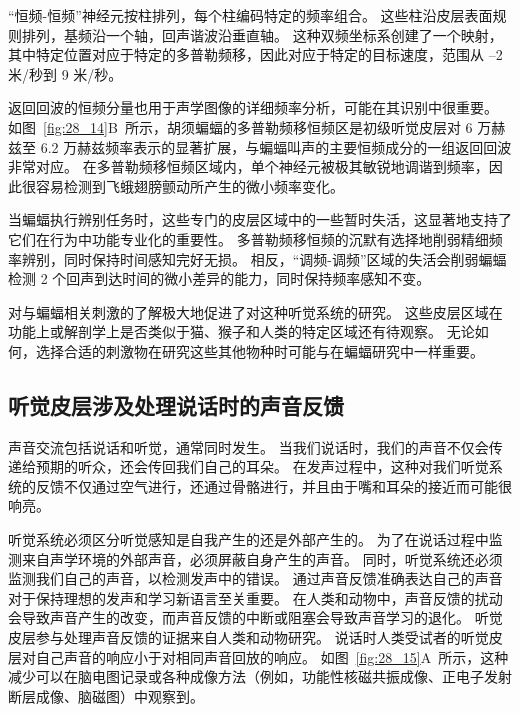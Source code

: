 “恒频-恒频”神经元按柱排列，每个柱编码特定的频率组合。
这些柱沿皮层表面规则排列，基频沿一个轴，回声谐波沿垂直轴。
这种双频坐标系创建了一个映射，其中特定位置对应于特定的多普勒频移，因此对应于特定的目标速度，范围从 –2 米/秒到 9 米/秒。


返回回波的恒频分量也用于声学图像的详细频率分析，可能在其识别中很重要。
如图~\ref{fig:28_14}B~所示，胡须蝙蝠的多普勒频移恒频区是初级听觉皮层对 6 万赫兹至 6.2 万赫兹频率表示的显著扩展，与蝙蝠叫声的主要恒频成分的一组返回回波非常对应。
在多普勒频移恒频区域内，单个神经元被极其敏锐地调谐到频率，因此很容易检测到飞蛾翅膀颤动所产生的微小频率变化。


当蝙蝠执行辨别任务时，这些专门的皮层区域中的一些暂时失活，这显著地支持了它们在行为中功能专业化的重要性。
多普勒频移恒频的沉默有选择地削弱精细频率辨别，同时保持时间感知完好无损。
相反，“调频-调频”区域的失活会削弱蝙蝠检测 2 个回声到达时间的微小差异的能力，同时保持频率感知不变。


对与蝙蝠相关刺激的了解极大地促进了对这种听觉系统的研究。
这些皮层区域在功能上或解剖学上是否类似于猫、猴子和人类的特定区域还有待观察。
无论如何，选择合适的刺激物在研究这些其他物种时可能与在蝙蝠研究中一样重要。



\subsection{听觉皮层涉及处理说话时的声音反馈}

声音交流包括说话和听觉，通常同时发生。
当我们说话时，我们的声音不仅会传递给预期的听众，还会传回我们自己的耳朵。
在发声过程中，这种对我们听觉系统的反馈不仅通过空气进行，还通过骨骼进行，并且由于嘴和耳朵的接近而可能很响亮。


听觉系统必须区分听觉感知是自我产生的还是外部产生的。
为了在说话过程中监测来自声学环境的外部声音，必须屏蔽自身产生的声音。
同时，听觉系统还必须监测我们自己的声音，以检测发声中的错误。
通过声音反馈准确表达自己的声音对于保持理想的发声和学习新语言至关重要。
在人类和动物中，声音反馈的扰动会导致声音产生的改变，而声音反馈的中断或阻塞会导致声音学习的退化。
听觉皮层参与处理声音反馈的证据来自人类和动物研究。
说话时人类受试者的听觉皮层对自己声音的响应小于对相同声音回放的响应。
如图~\ref{fig:28_15}A~所示，这种减少可以在脑电图记录或各种成像方法（例如，功能性核磁共振成像、正电子发射断层成像、脑磁图）中观察到。


